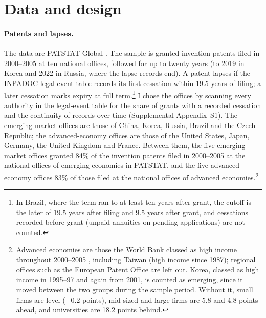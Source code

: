\section{Data and design}\label{sec:data}

\paragraph{Patents and lapses.} The data are PATSTAT Global \citep[autumn 2025 edition;][]{PATSTAT}. The sample is
granted invention patents filed in 2000--2005 at ten national offices, followed for up to twenty years (to 2019 in Korea and 2022 in Russia, where the
lapse records end). A patent
lapses if the INPADOC legal-event table records its first cessation within 19.5 years of filing; a later cessation
marks expiry at full term.\footnote{In Brazil, where the term ran to at least ten years after grant, the cutoff is the
later of 19.5 years after filing and 9.5 years after grant, and cessations recorded before grant (unpaid annuities on
pending applications) are not counted.} I chose the offices by scanning every authority in the legal-event table for the share of
grants with a recorded cessation and the continuity of records over time (Supplemental Appendix~S1). The
emerging-market offices are those of China, Korea, Russia, Brazil and the Czech Republic; the advanced-economy
offices are those of the United States, Japan, Germany, the United Kingdom and France. Between them, the five
emerging-market offices granted 84\% of the invention patents filed in 2000--2005 at the national offices of
emerging economies in PATSTAT, and the five advanced-economy offices 83\% of those filed at the national offices of
advanced economies.\footnote{Advanced economies are those the World Bank classed as high income throughout 2000--2005
\citep{WBincome}, including Taiwan (high income since 1987); regional offices such as the European Patent Office are
left out. Korea, classed as high income in 1995--97 and again from 2001, is counted as emerging, since it moved
between the two groups during the sample period. Without it, small firms are level ($-0.2$ points), mid-sized and large firms are 5.8 and 4.8 points
ahead, and universities are 18.2 points behind.}


